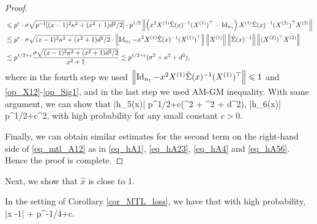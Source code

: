 \begin{proof}
\begin{align}
&\leqslant p^{c}\cdot \sigma \sqrt{p^{-1}[(x-1)^2\kappa^2 + (x^2+1)d^2/2]} \cdot p^{1/2} \left\| \left(x^2 X^{(1)}\hat\Sigma(x)^{-1} (X^{(1)})^\top-\operatorname{Id}_{n_1}\right) X^{(1)} \hat\Sigma(x)^{-1} (X^{(2)})^\top X^{(2)} \right\|  \nonumber\\
&\lesssim p^{c}\cdot \sigma \sqrt{ (x-1)^2\kappa^2 + (x^2+1)d^2/2} \cdot \left\|  \operatorname{Id}_{n_1}-x^2 X^{(1)}\hat\Sigma(x)^{-1} (X^{(1)})^\top\right\|  \left\|X^{(1)}\right\| \left\|\hat\Sigma(x)^{-1}\right\|\left\| (X^{(2)})^\top X^{(2)} \right\|  \nonumber\\
&\lesssim p^{1/2+c}\frac{\sigma \sqrt{ (x-1)^2\kappa^2 + (x^2+1)d^2/2}}{x^2+1} \lesssim p^{1/2+c}(\sigma^2 + \kappa^2 + d^2),\label{eq_hA4}
\end{align}
where in the fourth step we used $\left\|  \operatorname{Id}_{n_1}-x^2 X^{(1)}\hat\Sigma(x)^{-1} (X^{(1)})^\top\right\|\leqslant 1$ and \eqref{op_X12}-\eqref{op_Sig1}, and in the last step we used AM-GM inequality. With same argument, we can show that
\be\label{eq_hA56} \left|h_5(x)\right| \le p^{1/2+c}(\sigma^2 + \kappa^2 + d^2), \quad \left|h_6(x)\right| \le p^{1/2+c}\sigma^2,\ee
with high probability for any small constant $c>0$. %

Finally, we can obtain similar estimates for the second term on the right-hand side of \eqref{eq_mtl_A12} as in  \eqref{eq_hA1}, \eqref{eq_hA23}, \eqref{eq_hA4} and \eqref{eq_hA56}. Hence the proof is complete.
 \end{proof}

Next, we show that $\hat x$ is close to 1.
\begin{claim}\label{lem_hat_v}
 In the setting of Corollary \ref{cor_MTL_loss}, we have that with high probability,
	\be\label{hatw_add1}|\hat x -1|\le  {} + p^{-1/4+c}.
	\ee
\end{claim}

